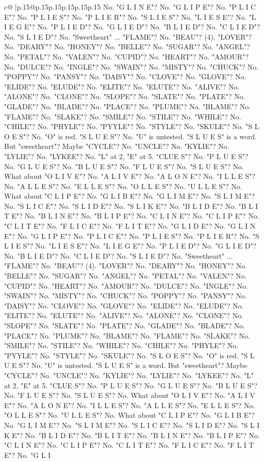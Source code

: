 \documentclass{article}
\begin{document}
{\begin{supertabular}{c@{$\;$}|p{.15\linewidth}@{}p{.15\linewidth}p{.15\linewidth}p{.15\linewidth}p{.15\linewidth}p{.15\linewidth}}
{{{No. "G L I N E"? No. "G L I P E"? No. "P L I C E"? No. "P L I E S"? No. "P L I E R"? No. "S L I E S"? No. "L I E S E"? No. "L I E G E"? No. "P L I E D"? No. "G L I E D"? No. "B L I E D"? No. "C L I E D"? No. "S L I E D"? No. "Sweetheart" ... "FLAME"? No. "BEAU"? (4). "LOVER"? No. "DEARY"? No. "HONEY"? No. "BELLE"? No. "SUGAR"? No. "ANGEL"? No. "PETAL"? No. "VALEN"? No. "CUPID"? No. "HEART"? No. "AMOUR"? No. "DULCE"? No. "INGLE"? No. "SWAIN"? No. "MISTY"? No. "CHUCK"? No. "POPPY"? No. "PANSY"? No. "DAISY"? No. "CLOVE"? No. "GLOVE"? No. "ELIDE"? No. "ELUDE"? No. "ELITE"? No. "ELUTE"? No. "ALIVE"? No. "ALONE"? No. "CLONE"? No. "SLOPE"? No. "SLATE"? No. "PLATE"? No. "GLADE"? No. "BLADE"? No. "PLACE"? No. "PLUME"? No. "BLAME"? No. "FLAME"? No. "SLAKE"? No. "SMILE"? No. "STILE"? No. "WHILE"? No. "CHILE"? No. "PHYLE"? No. "PYYLE"? No. "STYLE"? No. "SKULE"? No. "S L O E S"? No. "O" is red. "S L U E S"? No. "U" is untested. "S L U E S" is a word. But "sweetheart"? Maybe "CYCLE"? No. "UNCLE"? No. "KYLIE"? No. "LYLIE"? No. "LYKEE"? No. "L" at 2, "E" at 5. "CLUE S"? No. "P L U E S"? No. "G L U E S"? No. "B L U E S"? No. "F L U E S"? No. "S L U E S"? No. What about "O L I V E"? No. "A L I V E"? No. "A L O N E"? No. "I L L E S"? No. "A L L E S"? No. "E L L E S"? No. "O L L E S"? No. "U L L E S"? No. What about "C L I P E"? No. "G L I B E"? No. "G L I M E"? No. "S L I M E"? No. "S L I C E"? No. "S L I D E"? No. "S L I K E"? No. "B L I D E"? No. "B L I T E"? No. "B L I N E"? No. "B L I P E"? No. "C L I N E"? No. "C L I P E"? No. "C L I T E"? No. "F L I C E"? No. "F L I T E"? No. "G L I D E"? No. "G L I N E"? No. "G L I P E"? No. "P L I C E"? No. "P L I E S"? No. "P L I E R"? No. "S L I E S"? No. "L I E S E"? No. "L I E G E"? No. "P L I E D"? No. "G L I E D"? No. "B L I E D"? No. "C L I E D"? No. "S L I E D"? No. "Sweetheart" ... "FLAME"? No. "BEAU"? (4). "LOVER"? No. "DEARY"? No. "HONEY"? No. "BELLE"? No. "SUGAR"? No. "ANGEL"? No. "PETAL"? No. "VALEN"? No. "CUPID"? No. "HEART"? No. "AMOUR"? No. "DULCE"? No. "INGLE"? No. "SWAIN"? No. "MISTY"? No. "CHUCK"? No. "POPPY"? No. "PANSY"? No. "DAISY"? No. "CLOVE"? No. "GLOVE"? No. "ELIDE"? No. "ELUDE"? No. "ELITE"? No. "ELUTE"? No. "ALIVE"? No. "ALONE"? No. "CLONE"? No. "SLOPE"? No. "SLATE"? No. "PLATE"? No. "GLADE"? No. "BLADE"? No. "PLACE"? No. "PLUME"? No. "BLAME"? No. "FLAME"? No. "SLAKE"? No. "SMILE"? No. "STILE"? No. "WHILE"? No. "CHILE"? No. "PHYLE"? No. "PYYLE"? No. "STYLE"? No. "SKULE"? No. "S L O E S"? No. "O" is red. "S L U E S"? No. "U" is untested. "S L U E S" is a word. But "sweetheart"? Maybe "CYCLE"? No. "UNCLE"? No. "KYLIE"? No. "LYLIE"? No. "LYKEE"? No. "L" at 2, "E" at 5. "CLUE S"? No. "P L U E S"? No. "G L U E S"? No. "B L U E S"? No. "F L U E S"? No. "S L U E S"? No. What about "O L I V E"? No. "A L I V E"? No. "A L O N E"? No. "I L L E S"? No. "A L L E S"? No. "E L L E S"? No. "O L L E S"? No. "U L L E S"? No. What about "C L I P E"? No. "G L I B E"? No. "G L I M E"? No. "S L I M E"? No. "S L I C E"? No. "S L I D E"? No. "S L I K E"? No. "B L I D E"? No. "B L I T E"? No. "B L I N E"? No. "B L I P E"? No. "C L I N E"? No. "C L I P E"? No. "C L I T E"? No. "F L I C E"? No. "F L I T E"? No. "G L I }}}
\end{supertabular}}
\end{document}
